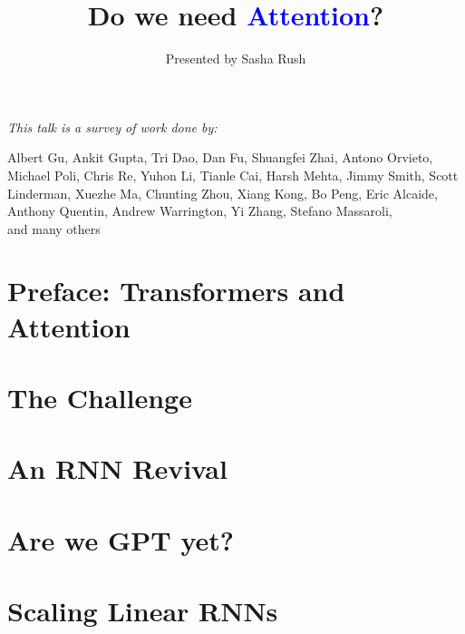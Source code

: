 \documentclass[14pt,aspectratio=169]{beamer}
\title{Do we need \textcolor{blue}{Attention}?}
\author{Presented by Sasha Rush}
\begin{document}
{
  \begin{frame}
    \titlepage
  \end{frame}
}

\begin{frame}[label=c]{}
    \textit{
    This talk is a survey of work done by:
}
    
    \begin{center}
    Albert Gu, Ankit Gupta, Tri Dao, Dan Fu, Shuangfei Zhai, Antono Orvieto, Michael Poli, Chris Re, Yuhon Li, Tianle Cai, Harsh Mehta, Jimmy Smith, Scott Linderman, Xuezhe Ma, Chunting Zhou, Xiang Kong, Bo Peng, Eric Alcaide, Anthony Quentin, Andrew Warrington, Yi Zhang, Stefano Massaroli, \\and many others
    \end{center}

\end{frame}

\section{Preface: Transformers and Attention}



\section{The Challenge}


\section{An RNN Revival}
 

\section{Are we GPT yet?}
 

% 


\section{Scaling Linear RNNs}

\end{document}
